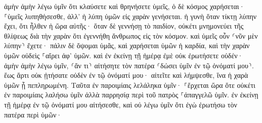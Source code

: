\documentclass{openreader}
\begin{document}
ἀμὴν ἀμὴν λέγω ὑμῖν ὅτι κλαύσετε καὶ θρηνήσετε ὑμεῖς, ὁ δὲ κόσμος χαρήσεται· ⸀ὑμεῖς λυπηθήσεσθε, ἀλλ’ ἡ λύπη ὑμῶν εἰς χαρὰν γενήσεται. 
ἡ γυνὴ ὅταν τίκτῃ λύπην ἔχει, ὅτι ἦλθεν ἡ ὥρα αὐτῆς· ὅταν δὲ γεννήσῃ τὸ παιδίον, οὐκέτι μνημονεύει τῆς θλίψεως διὰ τὴν χαρὰν ὅτι ἐγεννήθη ἄνθρωπος εἰς τὸν κόσμον. 
καὶ ὑμεῖς οὖν ⸂νῦν μὲν λύπην⸃ ἔχετε· πάλιν δὲ ὄψομαι ὑμᾶς, καὶ χαρήσεται ὑμῶν ἡ καρδία, καὶ τὴν χαρὰν ὑμῶν οὐδεὶς ⸀αἴρει ἀφ’ ὑμῶν. 
καὶ ἐν ἐκείνῃ τῇ ἡμέρᾳ ἐμὲ οὐκ ἐρωτήσετε οὐδέν· ἀμὴν ἀμὴν λέγω ὑμῖν, ⸂ἄν τι⸃ αἰτήσητε τὸν πατέρα ⸂δώσει ὑμῖν ἐν τῷ ὀνόματί μου⸃. 
ἕως ἄρτι οὐκ ᾐτήσατε οὐδὲν ἐν τῷ ὀνόματί μου· αἰτεῖτε καὶ λήμψεσθε, ἵνα ἡ χαρὰ ὑμῶν ᾖ πεπληρωμένη. 
Ταῦτα ἐν παροιμίαις λελάληκα ὑμῖν· ⸀ἔρχεται ὥρα ὅτε οὐκέτι ἐν παροιμίαις λαλήσω ὑμῖν ἀλλὰ παρρησίᾳ περὶ τοῦ πατρὸς ⸀ἀπαγγελῶ ὑμῖν. 
ἐν ἐκείνῃ τῇ ἡμέρᾳ ἐν τῷ ὀνόματί μου αἰτήσεσθε, καὶ οὐ λέγω ὑμῖν ὅτι ἐγὼ ἐρωτήσω τὸν πατέρα περὶ ὑμῶν· 
\end{document}
